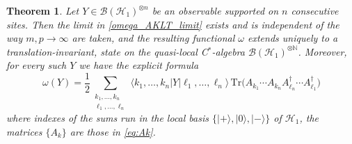 \documentclass[11pt,a4paper]{article}
\newtheorem{theorem}{Theorem}[section]
\def\Tr{\mathrm{Tr}}
\begin{document}
\begin{theorem}\label{thm:AKLT_infinite_volume}
Let \(Y\in\mathcal{B}(\mathcal{H}_{1})^{\otimes n}\) be an observable supported on \(n\) consecutive sites. Then the limit in \eqref{omega_AKLT_limit} exists and is independent of the way \(m,p\to\infty\) are taken, and the resulting functional \(\omega\) extends uniquely to a translation-invariant,  state on the quasi-local C\(^*\)-algebra \(\mathcal{B}(\mathcal{H}_{1})^{\otimes\mathbb{N}}\). Moreover, for every such \(Y\) we have the explicit formula
\begin{equation}\label{eq:omega_infinite_formula_second_linear}
\omega(Y)
=
\frac{1}{2}\sum_{\substack{k_1,\dots,k_n\\ \ell_1,\dots,\ell_n}}
\langle k_1,\dots,k_n|Y|\ell_1,\dots,\ell_n\rangle\,
\Tr\!\bigl(
 A_{k_1}\cdots A_{k_n}A_{\ell_n}^{\dagger}\cdots A_{\ell_1}^{\dagger}
\bigr)
\end{equation}
where indexes of the sums run in the local  basis  \(\{|+\rangle,|0\rangle,|-\rangle\}\)  of \(\mathcal{H}_{1}\), the matrices \(\{A_k\}\) are those in \eqref{eq:Ak}.
\end{theorem}
\end{document}
